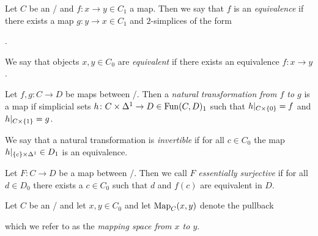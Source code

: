 \begin{definition}
    Let $C$ be an \inftycat/ and $f\colon x\to y\in C_1$ a map.
    Then we say that $f$ is an \emph{equivalence} if there exists a map $g\colon y\to x\in C_1$ and $2$-simplices of the form
    \begin{center}
        \;.
    \end{center}
    We say that objects $x,y\in C_0$ are \emph{equivalent} if there exists an equivalence $f\colon x\to y$.
\end{definition}
\begin{definition}
    Let $f,g\colon C\to D$ be maps between \inftycats/.
    Then a \emph{natural transformation from $f$ to $g$} is a map if simplicial sets $h\colon C\times\Delta^1\to D\in\operatorname{Fun}(C,D)_1$ such that $h|_{C\times\left\lbrace0\right\rbrace}=f$ and $h|_{C\times\left\lbrace1\right\rbrace}=g$.
    
    We say that a natural transformation is \emph{invertible} if for all $c\in C_0$ the map $h|_{\left\lbrace c\right\rbrace\times\Delta^1}\in D_1$ is an equivalence.
\end{definition}
\begin{definition}
    Let $F\colon C\to D$ be a map between \inftycats/.
    Then we call $F$ \emph{essentially surjective} if for all $d\in D_0$ there exists a $c\in C_0$ such that $d$ and $f(c)$ are equivalent in $D$.
\end{definition}
\begin{definition}\label{def:mappingSpace}
    Let $C$ be an \inftycat/ and let $x,y\in C_0$ and let $\operatorname{Map}_C(x,y)$ denote the pullback 
    \begin{center}
    \end{center}
    which we refer to as the \emph{mapping space from $x$ to $y$}.
\end{definition}
